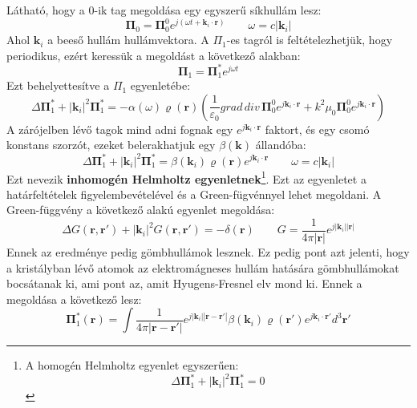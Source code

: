 \documentclass[../main.tex]{subfiles}
\begin{document}
Látható, hogy a 0-ik tag megoldása egy egyszerű síkhullám lesz:
\begin{equation}
    \mathbf{\Pi}_0 = \mathbf{\Pi}_{0}^0 e^{j(\omega t + \mathbf{k}_i \cdot \mathbf{r})} \qquad \omega = c |\mathbf{k}_i|
\end{equation}
Ahol $\mathbf{k}_i$ a beeső hullám hullámvektora. A $\Pi_1$-es tagról is feltételezhetjük, hogy periodikus, ezért keressük a megoldást a következő alakban:
\begin{equation}
    \mathbf{\Pi}_1 = \mathbf{\Pi}_{1}^* e^{j\omega t}
\end{equation}
Ezt behelyettesítve a $\Pi_1$ egyenletébe:
\begin{equation}
    \Delta \mathbf{\Pi}_{1}^* + |\mathbf{k}_i|^2 \mathbf{\Pi}_{1}^* = - \alpha(\omega) \varrho(\mathbf{r}) \left(\frac{1}{\varepsilon_0} grad \, div \, \mathbf{\Pi}_0^0 e^{j \mathbf{k}_i \cdot \mathbf{r}} + k^2 \mu_0 \mathbf{\Pi}_0^0 e^{j \mathbf{k}_i \cdot \mathbf{r}}\right)
\end{equation}
A zárójelben lévő tagok mind adni fognak egy $e^{j \mathbf{k}_i \cdot \mathbf{r}}$ faktort, és egy csomó konstans szorzót, ezeket belerakhatjuk egy $\beta(\mathbf{k})$ állandóba:
\begin{equation}
    \boxed{\Delta \mathbf{\Pi}_{1}^* + |\mathbf{k}_i|^2 \mathbf{\Pi}_{1}^* = \beta(\mathbf{k}_i) \varrho(\mathbf{r}) e^{j \mathbf{k}_i \cdot \mathbf{r}}} \qquad \omega = c |\mathbf{k}_i|
\end{equation}
Ezt nevezik \textbf{inhomogén Helmholtz egyenletnek}\footnote{
    A homogén Helmholtz egyenlet egyszerűen:
    \begin{equation}
        \Delta \mathbf{\Pi}_{1}^* + |\mathbf{k}_i|^2 \mathbf{\Pi}_{1}^* = 0
    \end{equation}
}. Ezt az egyenletet a határfeltételek figyelembevételével és a Green-fügvénnyel lehet megoldani. A Green-függvény a következő alakú egyenlet megoldása:
\begin{equation}
    \Delta G(\mathbf{r}, \mathbf{r}') + |\mathbf{k}_i|^2 G(\mathbf{r}, \mathbf{r}') = - \delta(\mathbf{r}) \qquad G = \frac{1}{4 \pi |\mathbf{r}|} e^{j |\mathbf{k}_i| |\mathbf{r}|}
\end{equation}
Ennek az eredménye pedig gömbhullámok lesznek. Ez pedig pont azt jelenti, hogy a kristályban lévő atomok az elektromágneses hullám hatására gömbhullámokat bocsátanak ki, ami pont az, amit Hyugens-Fresnel elv mond ki.
Ennek a megoldása a következő lesz:
\begin{equation}
    \mathbf{\Pi}_{1}^*(\mathbf{r}) = \int \frac{1}{4 \pi |\mathbf{r} - \mathbf{r}'|} e^{j |\mathbf{k}_i| |\mathbf{r} - \mathbf{r}'|} \beta(\mathbf{k}_i) \varrho(\mathbf{r}') e^{j \mathbf{k}_i \cdot \mathbf{r}'} d^3 \mathbf{r}'
\end{equation}  
\end{document}
